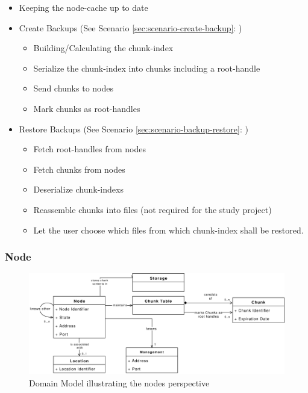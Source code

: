 \begin{itemize}
    \item Keeping the \gls{node-cache} up to date
    \item Create Backups (See Scenario \ref{sec:scenario-create-backup}: )
    \begin{itemize}
        \item Building/Calculating the \gls{chunk-index}
        \item Serialize the \gls{chunk-index} into \glspl{chunk} including a \gls{root-handle}
        \item Send \glspl{chunk} to \glspl{node}
        \item Mark \glspl{chunk} as \glspl{root-handle}
    \end{itemize}
    \item Restore Backups (See Scenario \ref{sec:scenario-backup-restore}: )
    \begin{itemize}
        \item Fetch \glspl{root-handle} from \glspl{node}
        \item Fetch \glspl{chunk} from \glspl{node}
        \item Deserialize \glspl{chunk-index}
        \item Reassemble \glspl{chunk} into \glspl{file} (not required for the study project)
        \item Let the \gls{user} choose which \glspl{file} from which \gls{chunk-index} shall be restored.
    \end{itemize}
\end{itemize}

\subsubsection{Node}

\begin{figure}[h]
    \centering
    \includegraphics[width=1\linewidth]{resources/node_domain_model}
    \caption[Node Domain Model]{Domain Model illustrating the \glspl{node} perspective}
\end{figure}

